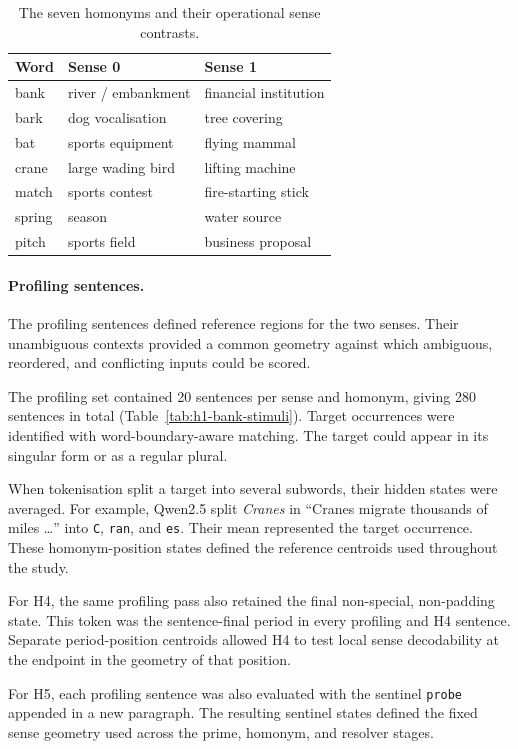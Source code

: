 \documentclass[conference]{IEEEtran}
\begin{document}
\begin{table}[!t]
\centering
\caption{The seven homonyms and their operational sense contrasts.}
\label{tab:homonyms}
\begin{tabular}{lll}
\hline
Word & Sense 0 & Sense 1 \\
\hline
bank & river / embankment & financial institution \\
bark & dog vocalisation & tree covering \\
bat & sports equipment & flying mammal \\
crane & large wading bird & lifting machine \\
match & sports contest & fire-starting stick \\
spring & season & water source \\
pitch & sports field & business proposal \\
\hline
\end{tabular}
\end{table}

\paragraph{Profiling sentences.}
The profiling sentences defined reference regions for the two senses. Their
unambiguous contexts provided a common geometry against which ambiguous,
reordered, and conflicting inputs could be scored.

The profiling set contained 20 sentences per sense and homonym, giving 280
sentences in total (Table~\ref{tab:h1-bank-stimuli}). Target occurrences were
identified with word-boundary-aware matching. The target could appear in its
singular form or as a regular plural.

When tokenisation split a target into several subwords, their hidden states
were averaged. For example, Qwen2.5 split \emph{Cranes} in ``Cranes migrate
thousands of miles \ldots'' into \texttt{C}, \texttt{ran}, and \texttt{es}.
Their mean represented the target occurrence. These homonym-position states
defined the reference centroids used throughout the study.

For H4, the same profiling pass also retained the final non-special,
non-padding state. This token was the sentence-final period in every profiling
and H4 sentence. Separate period-position centroids allowed H4 to test local
sense decodability at the endpoint in the geometry of that position.

For H5, each profiling sentence was also evaluated with the sentinel
\texttt{probe} appended in a new paragraph. The resulting sentinel states
defined the fixed sense geometry used across the prime, homonym, and resolver
stages.
\end{document}
